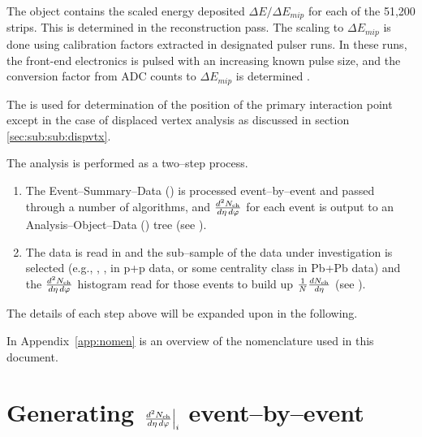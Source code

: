 \documentclass[11pt]{article}
\begin{document}
The \FMD{} \ESD{} object contains the scaled energy deposited $\Delta
E/\Delta E_{mip}$ for each of the 51,200 strips.  This is determined
in the reconstruction pass.  The scaling to $\Delta E_{mip}$ is done
using calibration factors extracted in designated pulser runs.  In
these runs, the front-end electronics is pulsed with an increasing
known pulse size, and the conversion factor from ADC counts to $\Delta
E_{mip}$ is determined \cite{cholm:2009}.

The \SPD{} is used for determination of the position of the primary
interaction point except in the case of displaced vertex analysis as
discussed in section \ref{sec:sub:sub:dispvtx}.

The analysis is performed as a two--step process.  
\begin{enumerate}
\item The Event--Summary--Data (\ESD{}) is processed event--by--event
  and passed through a number of algorithms, and
  $\dndetadphi$ for each event is output to an Analysis--Object--Data
  (\AOD{}) tree (see ).
\item The \AOD{} data is read in and the sub--sample of the data under
  investigation is selected (e.g., \INEL{}, \INELONE{}, \NSD{} in p+p data, or
  some centrality class in Pb+Pb data) and the $\dndetadphi$ histogram read for
  those events to build up $\dndeta$ (see ).
\end{enumerate}
The details of each step above will be expanded upon in the
following. 

In Appendix~\ref{app:nomen} is an overview of the nomenclature used in
this document.

\section{Generating $\dndetadphi[i]$ event--by--event}
\label{sec:gen_aod}
\end{document}
